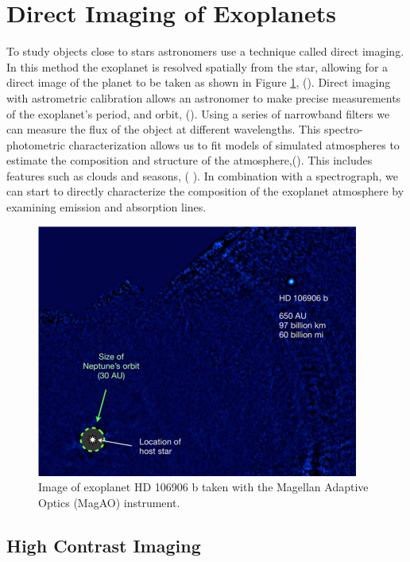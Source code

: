 \section{Direct Imaging of Exoplanets}

 To study objects close to stars astronomers use a technique called direct imaging. In this method the exoplanet is resolved spatially from the star, allowing for a direct image of the planet to be taken as shown in Figure \ref{fig:exoplanets}, (\cite{bailey2013hd}). Direct imaging with astrometric calibration allows an astronomer to make precise measurements of the exoplanet’s period, and orbit, (\cite{seager2010exoplanets}). Using a series of narrowband filters we can measure the flux of the object at different wavelengths. This spectro-photometric characterization allows us to fit models of simulated atmospheres to estimate the composition and structure of the atmosphere,(\cite{morzinski2015magellan}). This includes features such as clouds and seasons, ( \cite{skemer2012first}). In combination with a spectrograph, we can start to directly characterize the composition of the exoplanet atmosphere by examining emission and absorption lines. 
 

\begin{figure}
    \centering
    \includegraphics{Chapter Materials/Introduction Materials/Introduction Figures/HCexoplanet.png}
    \caption{Image of exoplanet HD 106906 b taken with the Magellan Adaptive Optics (MagAO) instrument. \cite{bailey2013hd}}
    \label{fig:exoplanets}
\end{figure}



\subsection{High Contrast Imaging}

